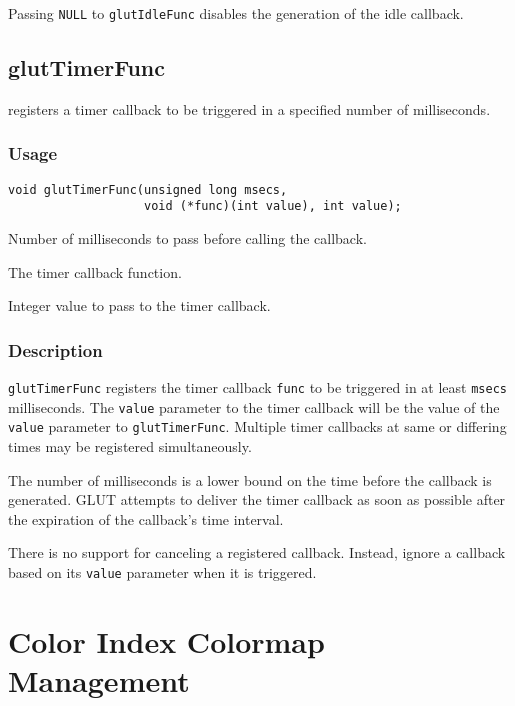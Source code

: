Passing {\tt NULL} to {\tt glutIdleFunc}
disables the generation of the idle callback.

\subsection{glutTimerFunc}

 registers a timer callback to be triggered
in a specified number of milliseconds.

\subsubsection*{Usage}
\begin{verbatim}
void glutTimerFunc(unsigned long msecs,
                   void (*func)(int value), int value);
\end{verbatim}
\begin{description}
\itemsep 0in
\item[{\tt msecs}]
Number of milliseconds to pass before calling the callback.
\item[{\tt func}]
The timer callback function.
\item[{\tt value}]
Integer value to pass to the timer callback.
\end{description}

\subsubsection*{Description}

{\tt glutTimerFunc} registers the timer callback {\tt func} to be triggered
in at least {\tt msecs} milliseconds.  The {\tt value} parameter to the timer
callback will be the value of the {\tt value} parameter to {\tt glutTimerFunc}.
Multiple timer callbacks at same or differing times may be registered
simultaneously.

The number of milliseconds is a lower bound on the time before the
callback is generated.  GLUT attempts to deliver the timer callback
as soon as possible after the expiration of the callback's time interval.

There is no support for canceling a registered callback.  Instead,
ignore a callback based on its {\tt value} parameter when it is triggered.

\section{Color Index Colormap Management}

